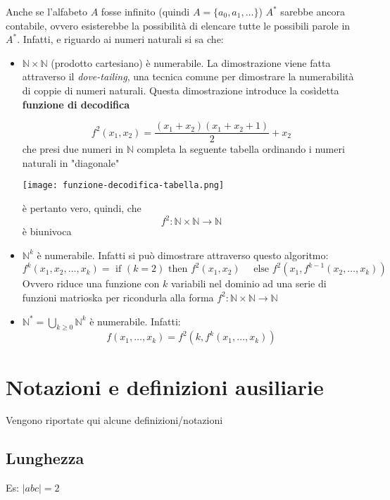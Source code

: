 Anche se l'alfabeto $A$ fosse infinito (quindi $A=\{a_0, a_1, \dots\}$) $A^*$ sarebbe ancora contabile, ovvero esisterebbe la possibilità di elencare tutte le possibili parole in $A^*$. Infatti,  e riguardo ai numeri naturali si sa che:
\begin{itemize}
    \item $\mathbb{N}\times \mathbb{N}$ (prodotto cartesiano) è numerabile. La dimostrazione viene fatta attraverso il \textit{dove-tailing}, una tecnica comune per dimostrare la numerabilità di coppie di numeri naturali. Questa dimostrazione introduce la cosìdetta \textbf{funzione di decodifica}
    
    \[
        f^2(x_1,x_2) =\frac{(x_1+x_2)(x_1+x_2+1)}{2} + x_2
    \]
    che presi due numeri in $\mathbb{N}$ completa la seguente tabella ordinando i numeri naturali in "diagonale"
    
    \texttt{[image: funzione-decodifica-tabella.png]}

    è pertanto vero, quindi, che
    \[
        f^2:\mathbb{N}\times \mathbb{N}\to \mathbb{N}
    \]
    è biunivoca

    \item $\mathbb{N}^k$ è numerabile. Infatti si può dimostrare attraverso questo algoritmo:
    \[
        f^k(x_1,x_2,\dots,x_k) = \text{ if } (k=2) \text{ then } f^2(x_1,x_2)
        \quad \text{ else } f^2(x_1, f^{k-1}(x_2,\dots,x_k))
    \]
    Ovvero riduce una funzione con $k$ variabili nel dominio ad una serie di funzioni matrioska per ricondurla alla forma $f^2:\mathbb{N}\times\mathbb{N}\rightarrow \mathbb{N}$
    \item $\mathbb{N}^* = \bigcup_{k\geq 0}\mathbb{N}^k$ è numerabile. Infatti:
    \[
        f(x_1,\dots,x_k) = f^2(k,f^k(x_1,\dots, x_k))    
    \]

    
\end{itemize}

\section{Notazioni e definizioni ausiliarie}
Vengono riportate qui alcune definizioni/notazioni
\subsection{Lunghezza}
Es: $|abc|=2$ 
